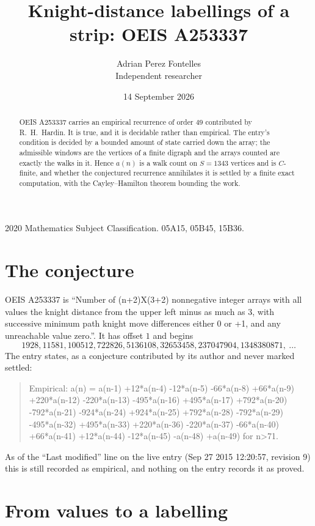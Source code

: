 \documentclass[11pt,a4paper]{article}
\title{Knight-distance labellings of a strip: OEIS A253337}
\author{Adrian Perez Fontelles\\ \small Independent researcher}
\date{14 September 2026}
\theoremstyle{plain}
\theoremstyle{definition}
\begin{document}
\maketitle

\begin{abstract}
OEIS A253337 carries an empirical recurrence of order $49$ contributed by R.~H.~Hardin. It is
true, and it is decidable rather than empirical. The entry's condition is decided by a bounded amount of state carried down the array; the
admissible windows are the vertices of a finite digraph and the arrays counted are exactly the
walks in it. Hence $a(n)$ is a walk count on $S=1343$ vertices and is $C$-finite, and whether the
conjectured recurrence annihilates it is settled by a finite exact computation, with the
Cayley--Hamilton theorem bounding the work.
\end{abstract}

\noindent\small 2020 Mathematics Subject Classification. 05A15, 05B45, 15B36.\normalsize

\section{The conjecture}

OEIS A253337 is ``Number of (n+2)X(3+2) nonnegative integer arrays with all values the knight distance from the upper left minus as much as 3, with successive minimum path knight move differences either 0 or +1, and any unreachable value zero.''. It has offset $1$ and begins
\[
1928, 11581, 100512, 722826, 5136108, 32653458, 237047904, 1348380871,\ \dots
\]
The entry states, as a conjecture contributed by its author and never marked settled:
\begin{quote}
Empirical: a(n) = a(n-1) +12*a(n-4) -12*a(n-5) -66*a(n-8) +66*a(n-9) +220*a(n-12) -220*a(n-13) -495*a(n-16) +495*a(n-17) +792*a(n-20) -792*a(n-21) -924*a(n-24) +924*a(n-25) +792*a(n-28) -792*a(n-29) -495*a(n-32) +495*a(n-33) +220*a(n-36) -220*a(n-37) -66*a(n-40) +66*a(n-41) +12*a(n-44) -12*a(n-45) -a(n-48) +a(n-49) for n>71.
\end{quote}
As of the ``Last modified'' line on the live entry (Sep 27 2015 12:20:57, revision 9) this is still
recorded as empirical, and nothing on the entry records it as proved.

\section{From values to a labelling}
\end{document}
